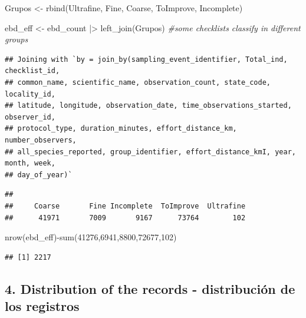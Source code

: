 \documentclass[
]{article}
\newenvironment{Shaded}{\begin{snugshade}}{\end{snugshade}}
\newcommand{\CommentTok}[1]{\textcolor[rgb]{0.56,0.35,0.01}{\textit{#1}}}
\newcommand{\DecValTok}[1]{\textcolor[rgb]{0.00,0.00,0.81}{#1}}
\newcommand{\FunctionTok}[1]{\textcolor[rgb]{0.00,0.00,0.00}{#1}}
\newcommand{\NormalTok}[1]{#1}
\newcommand{\OtherTok}[1]{\textcolor[rgb]{0.56,0.35,0.01}{#1}}
\newcommand{\SpecialCharTok}[1]{\textcolor[rgb]{0.00,0.00,0.00}{#1}}
\begin{document}
\begin{Shaded}
\begin{Highlighting}[]
\NormalTok{Grupos }\OtherTok{\textless{}{-}} \FunctionTok{rbind}\NormalTok{(Ultrafine, Fine, Coarse, ToImprove, Incomplete)}

\NormalTok{ebd\_eff }\OtherTok{\textless{}{-}}\NormalTok{ ebd\_count }\SpecialCharTok{|\textgreater{}}
  \FunctionTok{left\_join}\NormalTok{(Grupos) }\CommentTok{\#some checklists classify in different groups}
\end{Highlighting}
\end{Shaded}

\begin{verbatim}
## Joining with `by = join_by(sampling_event_identifier, Total_ind, checklist_id,
## common_name, scientific_name, observation_count, state_code, locality_id,
## latitude, longitude, observation_date, time_observations_started, observer_id,
## protocol_type, duration_minutes, effort_distance_km, number_observers,
## all_species_reported, group_identifier, effort_distance_kmI, year, month, week,
## day_of_year)`
\end{verbatim}

\begin{Shaded}
\end{Shaded}

\begin{verbatim}
## 
##     Coarse       Fine Incomplete  ToImprove  Ultrafine 
##      41971       7009       9167      73764        102
\end{verbatim}

\begin{Shaded}
\begin{Highlighting}[]
\FunctionTok{nrow}\NormalTok{(ebd\_eff)}\SpecialCharTok{{-}}\FunctionTok{sum}\NormalTok{(}\DecValTok{41276}\NormalTok{,}\DecValTok{6941}\NormalTok{,}\DecValTok{8800}\NormalTok{,}\DecValTok{72677}\NormalTok{,}\DecValTok{102}\NormalTok{)}
\end{Highlighting}
\end{Shaded}

\begin{verbatim}
## [1] 2217
\end{verbatim}

\hypertarget{distribution-of-the-records---distribuciuxf3n-de-los-registros}{%
\subsection{4. Distribution of the records - distribución de los
registros}\label{distribution-of-the-records---distribuciuxf3n-de-los-registros}}
\end{document}
